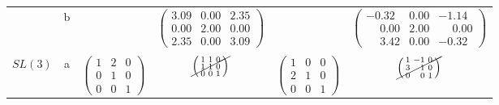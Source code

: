 \documentclass[12pt]{article}
\begin{document}
\begin{table}[htbp]
\begin{center}
\begin{tabular}{ c c c c c c}
      &
      \multirow{2}{*}{b}
      &

      &
      \multirow{2}{*}{
        $\left(
          \begin{smallmatrix}
            3.09 & 0.00 & 2.35\\
            0.00 & 2.00 & 0.00\\
            2.35 & 0.00 & 3.09
          \end{smallmatrix}
        \right)$}
      &

      &
      \multirow{2}{*}{
        $\left(
          \begin{smallmatrix}
            -0.32 & 0.00 & -1.14\\
            \phantom{-}0.00 & 2.00 & \phantom{-}0.00\\
            \phantom{-}3.42 & 0.00 & -0.32
          \end{smallmatrix}
        \right)$}
      \\
      \\
      \\
      \multirow{4}{*}{$SL(3)$}
      &
      \multirow{2}{*}{a}
      &
      \multirow{4}{*}{
        $\left(
          \begin{smallmatrix}
            1 & 2 & 0\\
            0 & 1 & 0\\
            0 & 0 & 1
          \end{smallmatrix}
        \right)$}
      &
      \multirow{2}{*}{
        $\cancel{\left(
          \begin{smallmatrix}
            1 & 1 & 0\\
            1 & 1 & 0\\
            0 & 0 & 1
          \end{smallmatrix}
        \right)}$}
      &
      \multirow{4}{*}{
        $\left(
          \begin{smallmatrix}
            1 & 0 & 0\\
            2 & 1 & 0\\
            0 & 0 & 1
          \end{smallmatrix}
        \right)$}
      &
      \multirow{2}{*}{
        $\cancel{\left(
          \begin{smallmatrix}
            1 & -1 & 0\\
            3 & \phantom{-}1 & 0\\
            0 & \phantom{-}0 & 1
          \end{smallmatrix}
        \right)}$}
      \\
      \\


\end{tabular}
\end{center}
\end{table}
\end{document}
